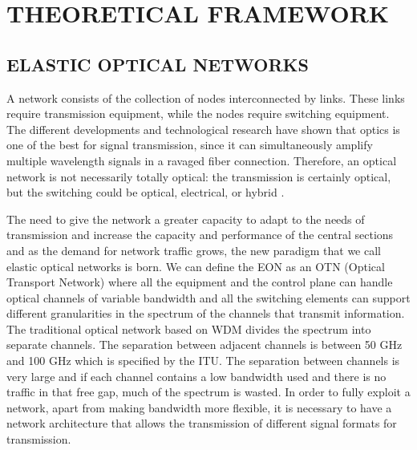
\chapter{THEORETICAL FRAMEWORK}

\section{ELASTIC OPTICAL NETWORKS}

A network consists of the collection of nodes interconnected by links.
These links require transmission equipment, while the nodes require
switching equipment. The different developments and technological
research have shown that optics is one of the best for signal transmission,
since it can simultaneously amplify multiple wavelength signals in
a ravaged fiber connection. Therefore, an optical network is not necessarily
totally optical: the transmission is certainly optical, but the switching
could be optical, electrical, or hybrid \cite{Mukherjee2006}. 

The need to give the network a greater capacity to adapt to the needs
of transmission and increase the capacity and performance of the central
sections and as the demand for network traffic grows, the new paradigm
that we call elastic optical networks is born. We can define the EON
as an OTN (Optical Transport Network) where all the equipment and
the control plane can handle optical channels of variable bandwidth
and all the switching elements can support different granularities
in the spectrum of the channels that transmit information. The traditional
optical network based on WDM divides the spectrum into separate channels.
The separation between adjacent channels is between 50 GHz and 100
GHz which is specified by the ITU. The separation between channels
is very large and if each channel contains a low bandwidth used and
there is no traffic in that free gap, much of the spectrum is wasted.
In order to fully exploit a network, apart from making bandwidth more
flexible, it is necessary to have a network architecture that allows
the transmission of different signal formats for transmission. 

